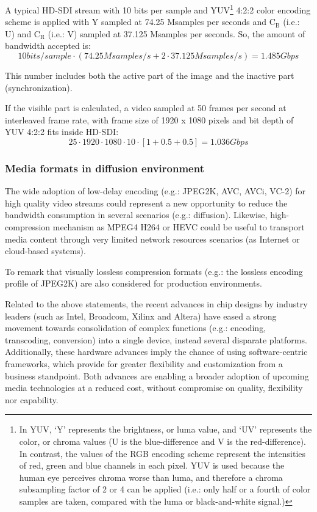 A typical HD-SDI stream with 10 bits per sample and YUV\footnote{In YUV, ‘Y’ represents the brightness, or luma value, and ‘UV’ represents the color, or chroma values (U is the blue-difference and V is the red-difference). In contrast, the values of the RGB encoding scheme represent the intensities of red, green and blue channels in each pixel. YUV is used because the human eye perceives chroma worse than luma, and therefore a chroma subsampling factor of 2 or 4 can be applied (i.e.: only half or a fourth of color samples are taken, compared with the luma or black-and-white signal.)} 4:2:2 color encoding scheme is applied with Y sampled at 74.25 Msamples per seconds and $\mathrm{C_{B}}$ (i.e.: U) and $\mathrm{C_{R}}$ (i.e.: V) sampled at 37.125 Msamples per seconds.  So, the amount of bandwidth accepted is:
\begin{equation}\label{E:sr}
10 bits/sample \cdot (74.25 Msamples/s + 2 \cdot 37.125 Msamples/s) = 1.485 Gbps
\end{equation}

This number includes both the active part of the image and the inactive part (synchronization).

If the visible part is calculated, a video sampled at 50 frames per second at interleaved frame rate, with frame size of 1920 x 1080 pixels and bit depth of YUV 4:2:2 fits inside HD-SDI:
\begin{equation}\label{E:srex}
25 \cdot 1920 \cdot 1080 \cdot 10 \cdot [1 + 0.5 + 0.5] = 1.036 Gbps
\end{equation}

\subsubsection{Media formats in diffusion environment}

The wide adoption of low-delay encoding (e.g.: JPEG2K, AVC, AVCi, VC-2) for high quality video streams could represent a new opportunity to reduce the bandwidth consumption in several scenarios (e.g.: diffusion). Likewise, high-compression mechanism as MPEG4 H264 or HEVC could be useful to transport media content through very limited network resources scenarios (as Internet or cloud-based systems).

To remark that visually lossless compression formats (e.g.: the lossless encoding profile of JPEG2K) are also considered for production environments.

Related to the above statements, the recent advances in chip designs by industry leaders (such as Intel, Broadcom, Xilinx and Altera) have eased a strong movement towards consolidation of complex functions (e.g.: encoding, transcoding, conversion) into a single device, instead several disparate platforms. Additionally, these hardware advances imply the chance of using software-centric frameworks, which provide for greater flexibility and customization from a business standpoint. Both advances are enabling a broader adoption of upcoming media technologies at a reduced cost, without compromise on quality, flexibility nor capability. 

